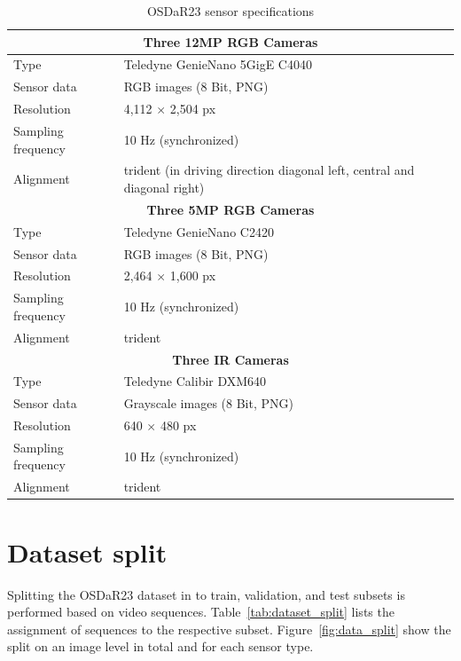 \documentclass[Master,MDS,english]{BASE/twbook} %
\begin{document}
\begin{table}[htbp]
  \centering
  \footnotesize
  \begin{tabular}{|l|l|}
    \hline
    \multicolumn{2}{|c|}{\textbf{Three 12MP RGB Cameras}}  \\
    \hline
    Type & Teledyne GenieNano 5GigE C4040  \\
    Sensor data & RGB images (8 Bit, PNG)  \\
    Resolution & 4,112 $\times$ 2,504 px  \\
    Sampling frequency & 10 Hz (synchronized)  \\
    Alignment & trident (in driving direction diagonal left, central and diagonal right)  \\
    \hline
    \multicolumn{2}{|c|}{\textbf{Three 5MP RGB Cameras}}  \\
    \hline
    Type & Teledyne GenieNano C2420  \\
    Sensor data & RGB images (8 Bit, PNG)  \\
    Resolution & 2,464 $\times$ 1,600 px \\
    Sampling frequency & 10 Hz (synchronized)  \\
    Alignment & trident  \\
    \hline
    \multicolumn{2}{|c|}{\textbf{Three IR Cameras}}  \\
    \hline
    Type & Teledyne Calibir DXM640  \\
    Sensor data & Grayscale images (8 Bit, PNG)  \\
    Resolution & 640 $\times$ 480 px  \\
    Sampling frequency & 10 Hz (synchronized)  \\
    Alignment & trident  \\
    \hline
  \end{tabular}
  \caption{OSDaR23 sensor specifications}
  \label{tab:cameras}
\end{table}



\section{Dataset split} \label{app:data_split}

Splitting the OSDaR23 dataset in to train, validation, and test subsets is performed based on video sequences. Table~\ref{tab:dataset_split} lists the assignment of sequences to the respective subset. Figure~\ref{fig:data_split} show the split on an image level in total and for each sensor type.
\end{document}
